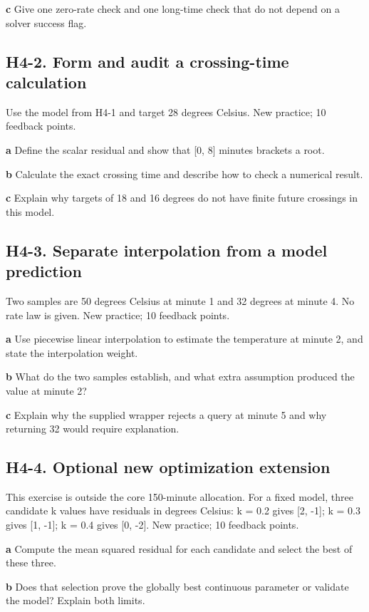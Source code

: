\documentclass[11pt,letterpaper]{article}
\theoremstyle{definition}\newtheorem{definition}{Definition}\newtheorem{example}{Example}
\numberwithin{equation}{section}
\begin{document}
\textbf{c} Give one zero-rate check and one long-time check that do not depend on a solver success flag.

\par\noindent\begin{minipage}{\linewidth}
\subsection*{H4-2. Form and audit a crossing-time calculation}
Use the model from H4-1 and target 28 degrees Celsius. New practice; 10 feedback points.

\textbf{a} Define the scalar residual and show that [0, 8] minutes brackets a root.

\end{minipage}\par\medskip
\textbf{b} Calculate the exact crossing time and describe how to check a numerical result.

\textbf{c} Explain why targets of 18 and 16 degrees do not have finite future crossings in this model.

\par\noindent\begin{minipage}{\linewidth}
\subsection*{H4-3. Separate interpolation from a model prediction}
Two samples are 50 degrees Celsius at minute 1 and 32 degrees at minute 4. No rate law is given. New practice; 10 feedback points.

\textbf{a} Use piecewise linear interpolation to estimate the temperature at minute 2, and state the interpolation weight.

\end{minipage}\par\medskip
\textbf{b} What do the two samples establish, and what extra assumption produced the value at minute 2?

\textbf{c} Explain why the supplied wrapper rejects a query at minute 5 and why returning 32 would require explanation.

\par\noindent\begin{minipage}{\linewidth}
\subsection*{H4-4. Optional new optimization extension}
This exercise is outside the core 150-minute allocation. For a fixed model, three candidate k values have residuals in degrees Celsius: k =\allowbreak{} 0.2 gives [2, -1]; k =\allowbreak{} 0.3 gives [1, -1]; k =\allowbreak{} 0.4 gives [0, -2]. New practice; 10 feedback points.

\textbf{a} Compute the mean squared residual for each candidate and select the best of these three.

\end{minipage}\par\medskip
\textbf{b} Does that selection prove the globally best continuous parameter or validate the model? Explain both limits.
\end{document}
